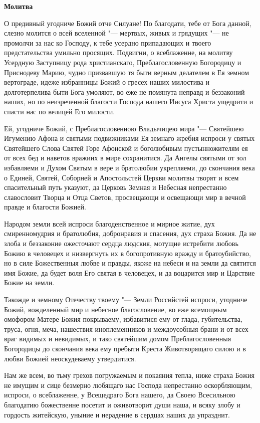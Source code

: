 \bfseries Молитва


\normalfont{}О предивный угодниче Божий отче Силуане! По благодати, тебе от Бога данной, слезно молится о всей вселенной "--- мертвых, живых и грядущих "--- не промолчи за нас ко Господу, к тебе усердно припадающих и твоего предстательства умильно просящих. Подвигни, о всеблаженне, на молитву Усердную Заступницу рода христианскаго, Преблагословенную Богородицу и Приснодеву Марию, чудно призвавшую тя быти верным делателем в Ея земном вертограде, идеже избранницы Божий о гресех наших милостива и долготерпелива быти Бога умоляют, во еже не помянута неправд и беззаконий наших, но по неизреченной благости Господа нашего Иисуса Христа ущедрити и спасти нас по велицей Его милости. 


Ей, угодниче Божий, с Преблагословенною Владычицею мира "--- Святейшею Игумению Афона и святыми подвижниками Ея земнаго жребия испроси у святых Святейшего Слова Святей Горе Афонской и боголюбивым пустынножителям ея от всех бед и наветов вражиих в мире сохранитися. Да Ангелы святыми от зол избавляеми и Духом Святым в вере и братолюбии укрепляеми, до скончания века о Единей, Святей, Соборней и Апостольстей Церкви молитвы творят и всем спасительный путь указуют, да Церковь Земная и Небесная непрестанно славословит Творца и Отца Светов, просвещающи и освещающи мир в вечной правде и благости Божией. 


Народом земли всей испроси благоденственное и мирное житие, дух смиренномудрия и братолюбия, добронравия и спасения, дух страха Божия. Да не злоба и беззаконие ожесточают сердца людския, мотущие истребити любовь Божию в человецех и низвергнуть их в богопротивную вражду и братоубийство, но в силе Божественныя любве и правды, якоже на небеси и на земли да святится имя Божие, да будет воля Его святая в человецех, и да воцарится мир и Царствие Божие на земли. 


Такожде и земному Отечеству твоему "--- Земли Российстей испроси, утодниче Божий, вожделенный мир и небесное благословение, во еже всемощным омофором Матере Божия покрываему, избавитися ему от глада, губительства, труса, огня, меча, нашествия иноплеменников и междоусобныя брани и от всех враг видимых и невидимых, и тако святейшим домом Преблагословенныя Богородицы до скончания века ему пребыти Креста Животворящаго силою и в любви Божией неоскудеваему утвердитися.


Нам же всем, во тьму грехов погружаемым и покаяния тепла, ниже страха Божия не имущим и сице безмерно любящаго нас Господа непрестанно оскорбляющим, испроси, о всеблаженне, у Всещедраго Бога нашего, да Своею Всесильною благодатию божественне посетит и оживотворит души наша, и всяку злобу и гордость житейскую, уныние и нерадение в сердцах наших да упразднит. 


